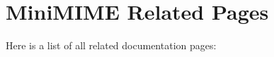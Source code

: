 \section{Mini\-MIME Related Pages}
Here is a list of all related documentation pages:\begin{CompactList}
\item {}

\end{CompactList}
